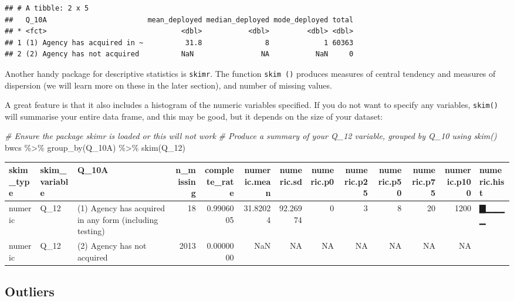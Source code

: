 \documentclass[
]{book}
\newenvironment{Shaded}{\begin{snugshade}}{\end{snugshade}}
\newcommand{\CommentTok}[1]{\textcolor[rgb]{0.56,0.35,0.01}{\textit{#1}}}
\newcommand{\FunctionTok}[1]{\textcolor[rgb]{0.00,0.00,0.00}{#1}}
\newcommand{\NormalTok}[1]{#1}
\newcommand{\SpecialCharTok}[1]{\textcolor[rgb]{0.00,0.00,0.00}{#1}}
\begin{document}
\begin{verbatim}
## # A tibble: 2 x 5
##   Q_10A                        mean_deployed median_deployed mode_deployed total
## * <fct>                                <dbl>           <dbl>         <dbl> <dbl>
## 1 (1) Agency has acquired in ~          31.8               8             1 60363
## 2 (2) Agency has not acquired          NaN                NA           NaN     0
\end{verbatim}

Another handy package for descriptive statistics is \texttt{skimr}. The function \texttt{skim\ ()} produces measures of central tendency and measures of dispersion (we will learn more on these in the later section), and number of missing values.

A great feature is that it also includes a histogram of the numeric variables specified. If you do not want to specify any variables, \texttt{skim()} will summarise your entire data frame, and this may be good, but it depends on the size of your dataset:

\begin{Shaded}
\begin{Highlighting}[]
\CommentTok{\# Ensure the package \textquotesingle{}skimr\textquotesingle{} is loaded or this will not work}
\CommentTok{\# Produce a summary of your Q\_12 variable, grouped by Q\_10 using skim() }
\NormalTok{bwcs }\SpecialCharTok{\%\textgreater{}\%} 
  \FunctionTok{group\_by}\NormalTok{(Q\_10A) }\SpecialCharTok{\%\textgreater{}\%} 
  \FunctionTok{skim}\NormalTok{(Q\_12)}
\end{Highlighting}
\end{Shaded}

\begin{tabular}{l|l|l|r|r|r|r|r|r|r|r|r|l}
\hline
skim\_type & skim\_variable & Q\_10A & n\_missing & complete\_rate & numeric.mean & numeric.sd & numeric.p0 & numeric.p25 & numeric.p50 & numeric.p75 & numeric.p100 & numeric.hist\\
\hline
numeric & Q\_12 & (1) Agency has acquired in any form (including testing) & 18 & 0.9906005 & 31.82024 & 92.26974 & 0 & 3 & 8 & 20 & 1200 & ▇▁▁▁▁\\
\hline
numeric & Q\_12 & (2) Agency has not acquired & 2013 & 0.0000000 & NaN & NA & NA & NA & NA & NA & NA & \\
\hline
\end{tabular}

\hypertarget{outliers}{%
\subsection{Outliers}\label{outliers}}
\end{document}
